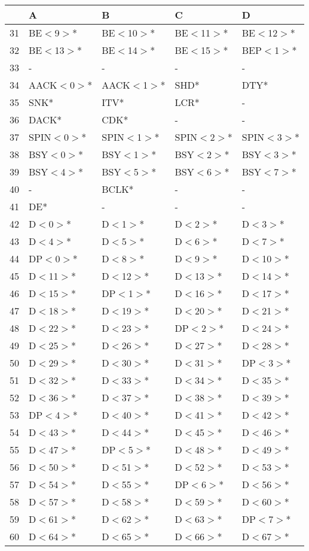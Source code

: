 %
\begin{table}[htbp]
   \begin{center}
\begingroup
\setlength{\tabcolsep}{6pt} %
\renewcommand{\arraystretch}{0.9} %
   \begin{tabular}{|r|l|l|l|l|} \hline
 &A&B&C&D\\ \hline
31&BE$<$9$>$*&BE$<$10$>$*&BE$<$11$>$*&BE$<$12$>$*\\
32&BE$<$13$>$*&BE$<$14$>$*&BE$<$15$>$*&BEP$<$1$>$*\\
33&-&-&-&-\\
34&AACK$<$0$>$*&AACK$<$1$>$*&SHD*&DTY*\\
35&SNK*&ITV*&LCR*&-\\
36&DACK*&CDK*&-&-\\
37&SPIN$<$0$>$*&SPIN$<$1$>$*&SPIN$<$2$>$*&SPIN$<$3$>$*\\
38&BSY$<$0$>$*&BSY$<$1$>$*&BSY$<$2$>$*&BSY$<$3$>$*\\
39&BSY$<$4$>$*&BSY$<$5$>$*&BSY$<$6$>$*&BSY$<$7$>$*\\
40&-&BCLK*&-&-\\
41&DE*&-&-&-\\
42&D$<$0$>$*&D$<$1$>$*&D$<$2$>$*&D$<$3$>$*\\
43&D$<$4$>$*&D$<$5$>$*&D$<$6$>$*&D$<$7$>$*\\
44&DP$<$0$>$*&D$<$8$>$*&D$<$9$>$*&D$<$10$>$*\\
45&D$<$11$>$*&D$<$12$>$*&D$<$13$>$*&D$<$14$>$*\\
46&D$<$15$>$*&DP$<$1$>$*&D$<$16$>$*&D$<$17$>$*\\
47&D$<$18$>$*&D$<$19$>$*&D$<$20$>$*&D$<$21$>$*\\
48&D$<$22$>$*&D$<$23$>$*&DP$<$2$>$*&D$<$24$>$*\\
49&D$<$25$>$*&D$<$26$>$*&D$<$27$>$*&D$<$28$>$*\\
50&D$<$29$>$*&D$<$30$>$*&D$<$31$>$*&DP$<$3$>$*\\
51&D$<$32$>$*&D$<$33$>$*&D$<$34$>$*&D$<$35$>$*\\
52&D$<$36$>$*&D$<$37$>$*&D$<$38$>$*&D$<$39$>$*\\
53&DP$<$4$>$*&D$<$40$>$*&D$<$41$>$*&D$<$42$>$*\\
54&D$<$43$>$*&D$<$44$>$*&D$<$45$>$*&D$<$46$>$*\\
55&D$<$47$>$*&DP$<$5$>$*&D$<$48$>$*&D$<$49$>$*\\
56&D$<$50$>$*&D$<$51$>$*&D$<$52$>$*&D$<$53$>$*\\
57&D$<$54$>$*&D$<$55$>$*&DP$<$6$>$*&D$<$56$>$*\\
58&D$<$57$>$*&D$<$58$>$*&D$<$59$>$*&D$<$60$>$*\\
59&D$<$61$>$*&D$<$62$>$*&D$<$63$>$*&DP$<$7$>$*\\
60&D$<$64$>$*&D$<$65$>$*&D$<$66$>$*&D$<$67$>$*\\
\hline
   \end{tabular}
\endgroup
   \end{center}
\end{table}
